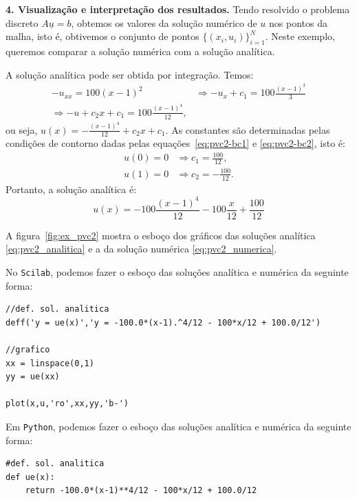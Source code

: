 \begin{sol}
{\bf 4. Visualização e interpretação dos resultados.} Tendo resolvido o problema discreto $A\underline{u} = b$, obtemos os valores da solução numérico de $u$ nos pontos da malha, isto é, obtivemos o conjunto de pontos $\{(x_i, u_i)\}_{i=1}^N$. Neste exemplo, queremos comparar a solução numérica com a solução analítica.

A solução analítica pode ser obtida por integração. Temos:
\begin{equation*}
  \begin{split}
    -u_{xx} = 100(x-1)^2 &\Rightarrow -u_x + c_1 = 100\frac{(x-1)^3}{3}\\
    \Rightarrow -u + c_2x + c_1 = 100\frac{(x-1)^4}{12},
  \end{split}
\end{equation*}
ou seja, $\displaystyle u(x) = - \frac{(x-1)^4}{12} + c_2x + c_1$. As constantes são determinadas pelas condições de contorno dadas pelas equações~\eqref{eq:pvc2-bc1} e \eqref{eq:pvc2-bc2}, isto é:
\begin{equation*}
  \begin{split}
    u(0) = 0 &\Rightarrow c_1 = \frac{100}{12},\\
    u(1) = 0 &\Rightarrow c_2 = -\frac{100}{12}.
  \end{split}
\end{equation*}
Portanto, a solução analítica é:
\begin{equation}\label{eq:pvc2_analitica}
  u(x) = -100\frac{(x-1)^4}{12} - 100\frac{x}{12} + \frac{100}{12}
\end{equation}

A figura~\ref{fig:ex_pvc2} mostra o esboço dos gráficos das soluções analítica \eqref{eq:pvc2_analitica} e a da solução numérica \eqref{eq:pvc2_numerica}.

\ifisscilab
No \verb+Scilab+, podemos fazer o esboço das soluções analítica e numérica da seguinte forma:
\begin{verbatim}
//def. sol. analitica
deff('y = ue(x)','y = -100.0*(x-1).^4/12 - 100*x/12 + 100.0/12')

//grafico
xx = linspace(0,1)
yy = ue(xx)

plot(x,u,'ro',xx,yy,'b-')
\end{verbatim}
\fi
\ifispython
Em \verb+Python+, podemos fazer o esboço das soluções analítica e numérica da seguinte forma:
\begin{verbatim}
#def. sol. analitica
def ue(x):
    return -100.0*(x-1)**4/12 - 100*x/12 + 100.0/12


\end{verbatim}
\end{sol}
